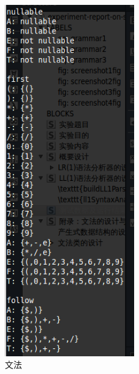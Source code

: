 \documentclass{article}
\begin{document}
\begin{CJK*}{UTF8}{gbsn}
\begin{figure}
\centering
\includegraphics[width=0.5\textwidth]{grammar.png}
\caption{文法}
\label{fig: grammarfig}
\end{figure}


\end{CJK*}
\end{document}
